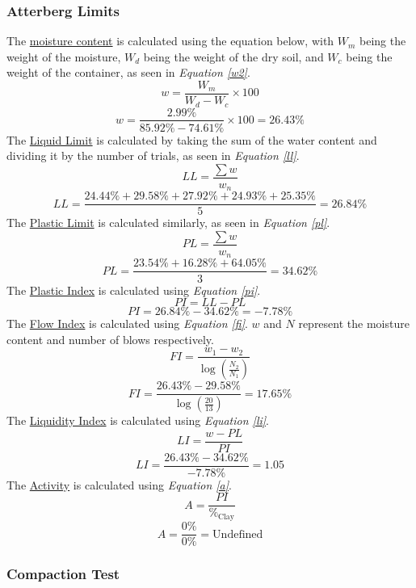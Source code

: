 \documentclass{article}
\begin{document}
\subsubsection{Atterberg Limits}
\noindent The \underline{moisture content} is calculated using the equation below, with $W_m$ being the weight of the moisture, $W_d$ being the weight of the dry soil, and $W_c$ being the weight of the container, as seen in \emph{Equation \ref{w2}}. 
\begin{equation}\label{w2} w=\frac{W_m}{W_d-W_c}\times 100 \end{equation}
\[w=\frac{2.99\%}{85.92\%-74.61\%}\times 100 = \boxed{26.43\%}\]
\noindent The \underline{Liquid Limit} is calculated by taking the sum of the water content and dividing it by the number of trials, as seen in \emph{Equation \ref{ll}}.
\begin{equation}\label{ll} LL=\frac{\sum w}{w_n} \end{equation}
\[LL=\frac{24.44\%+29.58\%+27.92\%+24.93\%+25.35\%}{5}=\boxed{26.84\%}\]
\noindent The \underline{Plastic Limit} is calculated similarly, as seen in \emph{Equation \ref{pl}}.
\begin{equation}\label{pl} PL=\frac{\sum w}{w_n} \end{equation}
\[PL=\frac{23.54\%+16.28\%+64.05\%}{3}=\boxed{34.62\%}\]
\noindent The \underline{Plastic Index} is calculated using \emph{Equation \ref{pi}}. 
\begin{equation}\label{pi}PI=LL-PL\end{equation} 
\[PI=26.84\%-34.62\%=\boxed{-7.78\%}\]
\noindent The \underline{Flow Index} is calculated using \emph{Equation \ref{fi}}. $w$ and $N$ represent the moisture content and number of blows respectively. 
\begin{equation}\label{fi}FI=\frac{w_1-w_2}{\log\left(\frac{N_2}{N_1}\right)}\end{equation}  
\[FI=\frac{26.43\%-29.58\%}{\log\left(\frac{20}{13}\right)}=\boxed{17.65\%}\]
\noindent The \underline{Liquidity Index} is calculated using \emph{Equation \ref{li}}. 
\begin{equation}\label{li}LI=\frac{w-PL}{PI}\end{equation} 
\[LI=\frac{26.43\%-34.62\%}{-7.78\%}=\boxed{1.05}\]
\noindent The \underline{Activity} is calculated using \emph{Equation \ref{a}}.
\begin{equation}\label{a}A=\frac{PI}{\%_\text{Clay}}\end{equation} 
\[A=\frac{0\%}{0\%}=\boxed{\text{Undefined}}\]
\subsubsection{Compaction Test}
\end{document}
